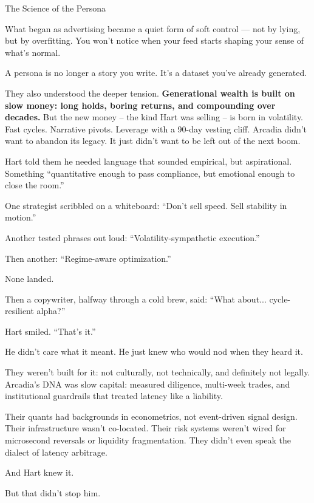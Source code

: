 \begin{HistoricalSidebar}{The Science of the Persona}
  \medskip
  
  What began as advertising became a quiet form of soft control — not by lying, but by overfitting.  
  You won’t notice when your feed starts shaping your sense of what’s normal.
  
  \medskip
  
  A persona is no longer a story you write.  
  It’s a dataset you’ve already generated.
  
\end{HistoricalSidebar}
  
\medskip

They also understood the deeper tension.
\textbf{Generational wealth is built on slow money: long holds, boring returns, and compounding over decades.}
But the new money -- the kind Hart was selling -- is born in volatility.
Fast cycles. Narrative pivots. Leverage with a 90-day vesting cliff.
Arcadia didn’t want to abandon its legacy.
It just didn’t want to be left out of the next boom.

Hart told them he needed language that sounded empirical, but aspirational.
Something ``quantitative enough to pass compliance, but emotional enough to close the room.''

One strategist scribbled on a whiteboard:
``Don’t sell speed. Sell stability in motion.''

Another tested phrases out loud: ``Volatility-sympathetic execution.''

Then another: ``Regime-aware optimization.''

None landed.

Then a copywriter, halfway through a cold brew, said:
``What about... cycle-resilient alpha?''

Hart smiled.
``That’s it.''

He didn’t care what it meant.
He just knew who would nod when they heard it.

They weren’t built for it: not culturally, not technically, and definitely not legally.
Arcadia’s DNA was slow capital: measured diligence, multi-week trades, and institutional guardrails that treated 
latency like a liability.

Their quants had backgrounds in econometrics, not event-driven signal design.
Their infrastructure wasn’t co-located.
Their risk systems weren’t wired for microsecond reversals or liquidity fragmentation.
They didn’t even speak the dialect of latency arbitrage.

And Hart knew it.

But that didn’t stop him.

